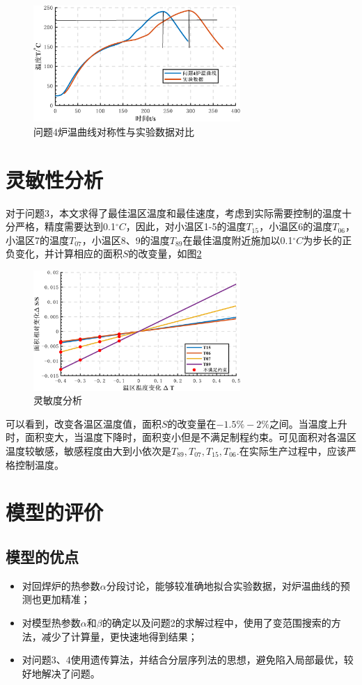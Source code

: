 \documentclass[withoutpreface,bwprint]{cumcmthesis} %
\begin{document}
	\begin{figure}[H]
	\centering
	\includegraphics[width=0.70\textwidth]{问题4炉温曲线}
	\caption{问题4炉温曲线对称性与实验数据对比}
	\label{问题4炉温曲线}
\end{figure}

	\section{灵敏性分析}
	对于问题3，本文求得了最佳温区温度和最佳速度，考虑到实际需要控制的温度十分严格，精度需要达到0.1$^\circ C$，因此，对小温区1-5的温度$T_{15}$，小温区6的温度$T_{06}$，小温区7的温度$T_{07}$，小温区8、9的温度$T_{89}$在最佳温度附近施加以0.1$^\circ C$为步长的正负变化，并计算相应的面积$S$的改变量，如图\ref{灵敏度分析}
		\begin{figure}[H]
		\centering
		\includegraphics[width=0.70\textwidth]{灵敏度分析}
		\caption{灵敏度分析}
		\label{灵敏度分析}
	\end{figure}
	可以看到，改变各温区温度值，面积$S$的改变量在$-1.5\%-2\%$之间。当温度上升时，面积变大，当温度下降时，面积变小但是不满足制程约束。可见面积对各温区温度较敏感，敏感程度由大到小依次是$T_{89},T_{07},T_{15},T_{06}$.在实际生产过程中，应该严格控制温度。

	\section{模型的评价}
	\subsection{模型的优点}
	\begin{itemize}
		\item 对回焊炉的热参数$\alpha$分段讨论，能够较准确地拟合实验数据，对炉温曲线的预测也更加精准；
		\item 对模型热参数$\alpha$和$\beta$的确定以及问题2的求解过程中，使用了变范围搜索的方法，减少了计算量，更快速地得到结果；
		\item 对问题3、4使用遗传算法，并结合分层序列法的思想，避免陷入局部最优，较好地解决了问题。
	\end{itemize}
\end{document}
